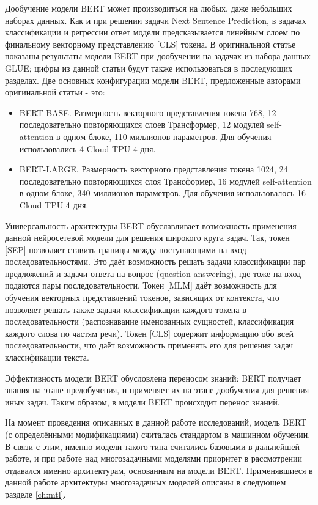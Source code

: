 Дообучение модели BERT может производиться на любых, даже небольших наборах данных. Как и при решении задачи Next Sentence Prediction, в задачах классификации и регрессии ответ модели предсказывается линейным слоем по финальному векторному представлению [CLS] токена. В оригинальной статье показаны результаты модели BERT при дообучении на задачах из набора данных GLUE; цифры из данной статьи будут также использоваться в последующих разделах. 
Две основных конфигурации модели BERT, предложенные авторами оригинальной статьи - это:
\begin{itemize}
\item BERT-BASE. Размерность векторного представления токена 768, 12 последовательно повторяющихся слоев Трансформер, 12 модулей self-attention в одном блоке, 110 миллионов параметров. Для обучения использовались 4 Cloud TPU 4 дня. 
\item BERT-LARGE. Размерность векторного представления токена 1024, 24 последовательно повторяющихся слоя Трансформер, 16 модулей self-attention в одном блоке, 340 миллионов параметров. Для обучения использовалось 16 Cloud TPU 4 дня. 
\end{itemize}

Универсальность архитектуры BERT обуславливает возможность применения данной нейросетевой модели для решения широкого круга задач. Так, токен [SEP] позволяет ставить границы между поступающими на вход последовательностями. Это даёт возможность решать задачи классификации пар предложений и задачи ответа на вопрос (question answering), где тоже на вход подаются пары последовательности. Токен [MLM] даёт возможность для обучения векторных представлений токенов, зависящих от контекста, что позволяет решать также задачи классификации каждого токена в последовательности (распознавание именованных сущностей, классификация каждого слова по частям речи). Токен [CLS] содержит информацию обо всей последовательности, что даёт возможность применять его для решения задач классификации текста. 

Эффективность модели BERT обусловлена переносом знаний: BERT получает знания на этапе предобучения, и применяет их на этапе дообучения для решения иных задач. Таким образом, в модели BERT происходит перенос знаний. 

На момент проведения описанных в данной работе исследований, модель BERT (с определёнными модификациями) считалась стандартом в машинном обучении. В связи с этим, именно модели такого типа считались базовыми в дальнейшей работе, и при работе над многозадачными моделями приоритет в рассмотрении отдавался именно архитектурам, основанным на модели BERT. Применявшиеся в данной работе архитектуры многозадачных моделей описаны в следующем разделе \ref{ch:mtl}.

